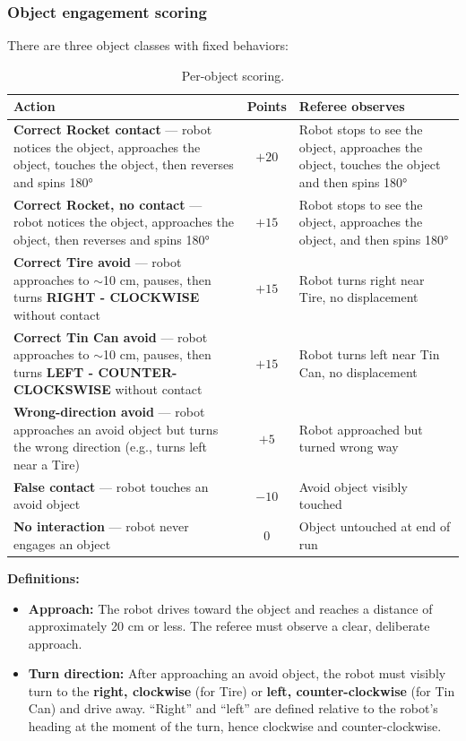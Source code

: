 \documentclass[a4]{article}
\begin{document}
\subsubsection*{Object engagement scoring}

There are three object classes with fixed behaviors:

\begin{table}[H]
\centering
\begin{tabular}{p{7cm}cp{7cm}}
\toprule
\textbf{Action} & \textbf{Points} & \textbf{Referee observes} \\
\midrule
\textbf{Correct Rocket contact} --- robot notices the object, approaches the object, touches the object, then reverses and spins 180° & $+20$ & Robot stops to see the object, approaches the object, touches the object and then spins 180° \\
\addlinespace
\textbf{Correct Rocket, no contact} --- robot notices the object, approaches the object, then reverses and spins 180° & $+15$ & Robot stops to see the object, approaches the object, and then spins 180° \\
\addlinespace
\textbf{Correct Tire avoid} --- robot approaches to $\sim$10 cm, pauses, then turns \textbf{RIGHT - CLOCKWISE} without contact & $+15$ & Robot turns right near Tire, no displacement \\
\addlinespace
\textbf{Correct Tin Can avoid} --- robot approaches to $\sim$10 cm, pauses, then turns \textbf{LEFT - COUNTER-CLOCKSWISE} without contact & $+15$ & Robot turns left near Tin Can, no displacement \\
\addlinespace
\textbf{Wrong-direction avoid} --- robot approaches an avoid object but turns the wrong direction (e.g., turns left near a Tire) & $+5$ & Robot approached but turned wrong way \\
\addlinespace
\textbf{False contact} --- robot touches an avoid object & $-10$ & Avoid object visibly touched \\
\addlinespace
\textbf{No interaction} --- robot never engages an object & $0$ & Object untouched at end of run \\
\bottomrule
\end{tabular}
\caption{Per-object scoring.}
\end{table}

\textbf{Definitions:}
\begin{itemize}
    \item \textbf{Approach:} The robot drives toward the object and reaches a distance of approximately 20 cm or less. The referee must observe a clear, deliberate approach.
    \item \textbf{Turn direction:} After approaching an avoid object, the robot must visibly turn to the \textbf{right, clockwise} (for Tire) or \textbf{left, counter-clockwise} (for Tin Can) and drive away. ``Right'' and ``left'' are defined relative to the robot's heading at the moment of the turn, hence clockwise and counter-clockwise.
\end{itemize}
\end{document}
